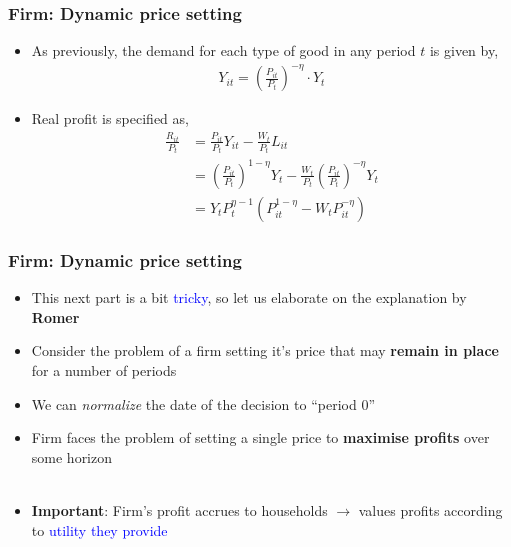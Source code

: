 \documentclass[10pt, xcolor=x11names, table]{beamer}
\begin{document}
\begin{frame}
\frametitle{Firm: Dynamic price setting}
\begin{itemize}
\item As previously, the demand for each type of good in any period $t$ is given by,
\begin{align*}
Y_{it} = \left(\frac{P_{it}}{P_{t}}\right)^{-\eta}\cdot{Y_{t}}
\end{align*}
\item Real profit is specified as,
\begin{align*}
\frac{R_{it}}{P_{t}} &= \frac{P_{it}}{P_{t}}Y_{it} - \frac{W_{t}}{P_{t}}L_{it} \\
 &= \left(\frac{P_{it}}{P_{t}}\right)^{1-\eta}Y_{t} - \frac{W_{t}}{P_{t}}\left(\frac{P_{it}}{P_{t}}\right)^{-\eta}Y_{t} \\
&=Y_{t}P_{t}^{\eta-1}(P_{it}^{1-\eta} - W_{t}P_{it}^{-\eta})
\end{align*}
\end{itemize}
\end{frame}

\begin{frame}
\frametitle{Firm: Dynamic price setting}
\begin{itemize}
\item This next part is a bit \textcolor{blue}{tricky}, so let us elaborate on the explanation by \textbf{Romer}
\item Consider the problem of a firm setting it's price that may \textbf{remain in place} for a number of periods
\item We can \emph{normalize} the date of the decision to ``period 0''
\item Firm faces the problem of setting a single price to \textbf{maximise profits} over some horizon \\~\\
\item \textbf{Important}: Firm's profit accrues to households $\rightarrow$ values profits according to \textcolor{blue}{utility they provide}
\end{itemize}
\end{frame}
\end{document}
